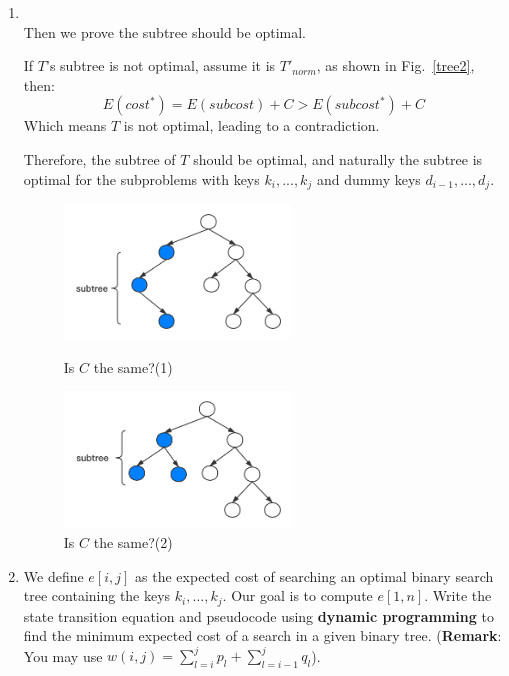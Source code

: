 \documentclass[12pt,a4paper]{article}
\makeatletter
\newtheorem*{solution}{Solution}
\theoremstyle{definition}
\renewenvironment{solution}[1][Solution] {\par\pushQED{\qed}\normalfont\topsep6\p@\@plus6\p@\relax\trivlist\item[\hskip\labelsep\bfseries#1\@addpunct{.}]\ignorespaces}{\popQED\endtrivlist\@endpefalse} \makeatother
\makeatother
\begin{document}
\begin{enumerate}
\begin{enumerate}
\begin{solution}
			~\\
			Then we prove the subtree should be optimal.
			
			If $T$'s subtree is not optimal, assume it is $T'_{norm}$, as shown in Fig.~\ref{tree2}, then:
			$$
			E(cost^*) = E(subcost) + C > E(subcost^*) + C
			$$
			Which means $T$ is not optimal, leading to a contradiction.
			
			Therefore, the subtree of $T$ should be optimal, and  naturally the subtree is optimal for the subproblems with keys $k_i,...,k_j$ and dummy keys $d_{i-1},...,d_j$.
			
	
                \begin{figure}[htbp]
            \centering
            \begin{minipage}[t]{0.48\textwidth}
            \centering
            \includegraphics[width=6cm]{Lab05-YanjieZe/tree3.png}
            \caption{Is $C$ the same?(1)}\label{tree3}
            \end{minipage}
            \begin{minipage}[t]{0.48\textwidth}
            \centering
            \includegraphics[width=6cm]{Lab05-YanjieZe/tree4.png}
           \caption{Is $C$ the same?(2)}\label{tree4}
            \end{minipage}
            \end{figure}
            
			\end{solution}
			
			\item We define $e[i, j]$ as the expected cost of searching an optimal binary search tree containing the keys $k_{i}, \ldots, k_{j} .$ Our goal is to compute $e[1, n]$. Write the state transition equation and pseudocode using \textbf{dynamic programming} to find
			the minimum expected cost of a search in a given binary tree. (\textbf{Remark}: You may use $ w(i, j)=\sum_{l=i}^{j} p_{l}+\sum_{l=i-1}^{j} q_{l} $).
			

\end{enumerate}
\end{enumerate}
\end{document}
